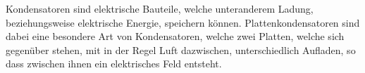 \documentclass{article}
\begin{document}
Kondensatoren sind elektrische Bauteile, welche unteranderem Ladung, beziehungsweise elektrische Energie, speichern können.
Plattenkondensatoren sind dabei eine besondere Art von Kondensatoren, welche zwei Platten, welche sich gegenüber stehen, mit in der Regel Luft dazwischen, unterschiedlich Aufladen, so dass zwischen ihnen ein elektrisches Feld entsteht.
\end{document}
